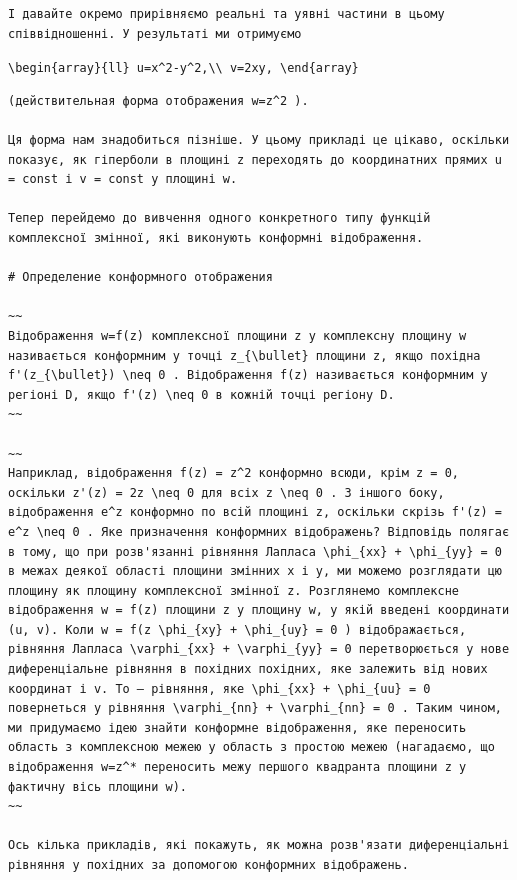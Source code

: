 \documentclass[
  ukrainian,
]{article}
\begin{document}
\begin{verbatim}
І давайте окремо прирівняємо реальні та уявні частини в цьому співвідношенні. У результаті ми отримуємо
\end{verbatim}

\texttt{\textbackslash{}begin\{array\}\{ll\}\ u=x\^{}2-y\^{}2,\textbackslash{}\textbackslash{}\ v=2xy,\ \textbackslash{}end\{array\}}

\begin{verbatim}
(действительная форма отображения w=z^2 ).

Ця форма нам знадобиться пізніше. У цьому прикладі це цікаво, оскільки показує, як гіперболи в площині z переходять до координатних прямих u = const і v = const у площині w.

Тепер перейдемо до вивчення одного конкретного типу функцій комплексної змінної, які виконують конформні відображення.

# Определение конформного отображения

~~
Відображення w=f(z) комплексної площини z у комплексну площину w називається конформним у точці z_{\bullet} площини z, якщо похідна f'(z_{\bullet}) \neq 0 . Відображення f(z) називається конформним у регіоні D, якщо f'(z) \neq 0 в кожній точці регіону D.
~~

~~
Наприклад, відображення f(z) = z^2 конформно всюди, крім z = 0, оскільки z'(z) = 2z \neq 0 для всіх z \neq 0 . З іншого боку, відображення e^z конформно по всій площині z, оскільки скрізь f'(z) = e^z \neq 0 . Яке призначення конформних відображень? Відповідь полягає в тому, що при розв'язанні рівняння Лапласа \phi_{xx} + \phi_{yy} = 0 в межах деякої області площини змінних x і y, ми можемо розглядати цю площину як площину комплексної змінної z. Розглянемо комплексне відображення w = f(z) площини z у площину w, у якій введені координати (u, v). Коли w = f(z \phi_{xy} + \phi_{uy} = 0 ) відображається, рівняння Лапласа \varphi_{xx} + \varphi_{yy} = 0 перетворюється у нове диференціальне рівняння в похідних похідних, яке залежить від нових координат і v. To — рівняння, яке \phi_{xx} + \phi_{uu} = 0 повернеться у рівняння \varphi_{nn} + \varphi_{nn} = 0 . Таким чином, ми придумаємо ідею знайти конформне відображення, яке переносить область з комплексною межею у область з простою межею (нагадаємо, що відображення w=z^* переносить межу першого квадранта площини z у фактичну вісь площини w).
~~

Ось кілька прикладів, які покажуть, як можна розв'язати диференціальні рівняння у похідних за допомогою конформних відображень.


\end{verbatim}
\end{document}
